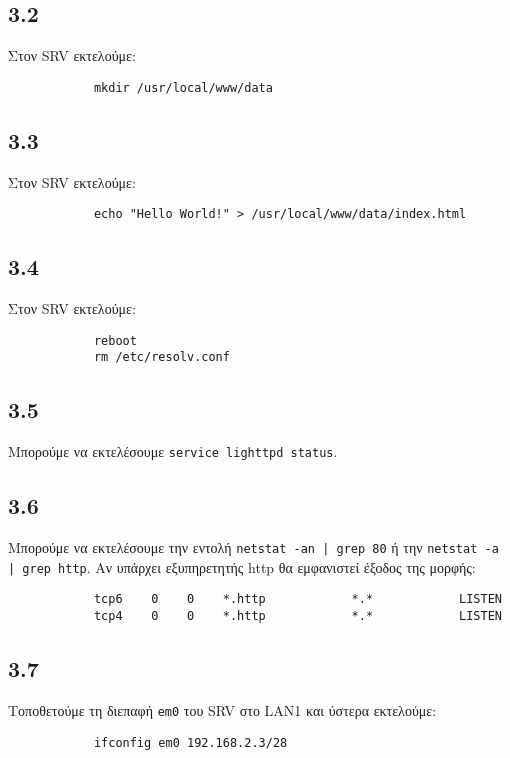 \documentclass[a4paper, 12pt]{article}
\begin{document}
	\subsection*{3.2}
		Στον SRV εκτελούμε:
		
		\begin{verbatim}
			mkdir /usr/local/www/data
		\end{verbatim}

	\subsection*{3.3}
		Στον SRV εκτελούμε:
		
		\begin{verbatim}
			echo "Hello World!" > /usr/local/www/data/index.html
		\end{verbatim}

	\subsection*{3.4}
		Στον SRV εκτελούμε:
		
		\begin{verbatim}
			reboot
			rm /etc/resolv.conf
		\end{verbatim}

	\subsection*{3.5}
		Μπορούμε να εκτελέσουμε \verb|service lighttpd status|.

	\subsection*{3.6}
		Μπορούμε να εκτελέσουμε την εντολή \verb+netstat -an | grep 80+ ή την \verb+netstat -a | grep http+. Αν υπάρχει εξυπηρετητής http θα εμφανιστεί έξοδος της μορφής:
		
		\begin{verbatim}
			tcp6    0    0    *.http            *.*            LISTEN
			tcp4    0    0    *.http            *.*            LISTEN
		\end{verbatim}

	\subsection*{3.7}
		Τοποθετούμε τη διεπαφή \verb|em0| του SRV στο LAN1 και ύστερα εκτελούμε:
		
		\begin{verbatim}
			ifconfig em0 192.168.2.3/28
		\end{verbatim}
\end{document}
